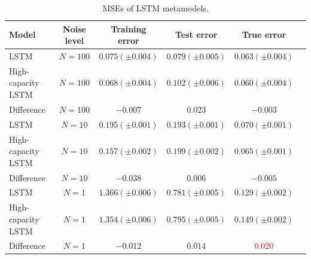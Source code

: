 \begin{table}[ht!]
    \small
    \centering
    \begin{tabular}{lccccc}
        \toprule
        \textbf{Model}      & \textbf{Noise level}   & \textbf{Training error}   & \textbf{Test error}   & \textbf{True error}\\
        \midrule
        LSTM                & $N=100$                & $0.075 (\pm0.004)$        & $0.079(\pm0.005)$     & $0.063 (\pm0.004)$ \\ 
        High-capacity LSTM  & $N=100$                & $0.068 (\pm0.004)$        & $0.102(\pm0.006)$     & $0.060 (\pm0.004)$ \\
        Difference          & $N=100$                & $-0.007$                  & $0.023$               & $-0.003$ \\
        \hline
        LSTM                & $N=10$                 & $0.195 (\pm0.001)$        & $0.193(\pm0.001)$     & $0.070 (\pm0.001)$ \\
        High-capacity LSTM  & $N=10$                 & $0.157 (\pm0.002)$        & $0.199(\pm0.002)$     & $0.065 (\pm0.001)$ \\
        Difference          & $N=10$                 & $-0.038$                  & $0.006$               & $-0.005$ \\
        \hline
        LSTM                & $N=1$                  & $1.366 (\pm0.006)$        & $0.781(\pm0.005)$     & $0.129 (\pm0.002)$ \\
        High-capacity LSTM  & $N=1$                  & $1.354 (\pm0.006)$        & $0.795(\pm0.005)$     & $0.149 (\pm0.002)$ \\
        Difference          & $N=1$                  & $-0.012$                  & $0.014$               & \textcolor{red}{$0.020$} \\
        \bottomrule
    \end{tabular}
    \caption{MSEs of LSTM metamodels.}
    \label{tab:lstm_arch}
\end{table}

